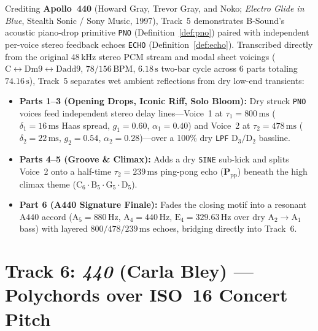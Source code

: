 Crediting \textbf{Apollo~440} (Howard Gray, Trevor Gray, and Noko; \emph{Electro Glide in Blue}, Stealth Sonic / Sony Music, 1997), Track~5 demonstrates B-Sound's acoustic piano-drop primitive \texttt{PNO} (Definition~\ref{def:pno}) paired with independent per-voice stereo feedback echoes \texttt{ECHO} (Definition~\ref{def:echo}). Transcribed directly from the original 48\,kHz stereo PCM stream and modal sheet voicings ($\mathrm{C} \leftrightarrow \mathrm{Dm9} \leftrightarrow \mathrm{Dadd9}$, $78/156\,\text{BPM}$, $6.18\,\text{s}$ two-bar cycle across $6$ parts totaling $74.16\,\text{s}$), Track~5 separates wet ambient reflections from dry low-end transients:
\begin{itemize}[leftmargin=1.5em]
  \item \textbf{Parts 1--3 (Opening Drops, Iconic Riff, Solo Bloom):} Dry struck \texttt{PNO} voices feed independent stereo delay lines—Voice~1 at $\tau_1 = 800\,\text{ms}$ ($\delta_1 = 16\,\text{ms}$ Haas spread, $g_1 = 0.60$, $\alpha_1 = 0.40$) and Voice~2 at $\tau_2 = 478\,\text{ms}$ ($\delta_2 = 22\,\text{ms}$, $g_2 = 0.54$, $\alpha_2 = 0.28$)—over a 100\% dry \texttt{LPF} $\mathrm{D}_3/\mathrm{D}_2$ bassline.
  \item \textbf{Parts 4--5 (Groove \& Climax):} Adds a dry \texttt{SINE} sub-kick and splits Voice~2 onto a half-time $\tau_2 = 239\,\text{ms}$ ping-pong echo ($\mathbf{P}_{\mathrm{pp}}$) beneath the high climax theme ($\mathrm{C}_6 \cdot \mathrm{B}_5 \cdot \mathrm{G}_5 \cdot \mathrm{D}_5$).
  \item \textbf{Part 6 (A440 Signature Finale):} Fades the closing motif into a resonant $\mathrm{A}440$ accord ($\mathrm{A}_5 = 880\,\text{Hz}$, $\mathrm{A}_4 = 440\,\text{Hz}$, $\mathrm{E}_4 = 329.63\,\text{Hz}$ over dry $\mathrm{A}_2 \to \mathrm{A}_1$ bass) with layered $800 / 478 / 239\,\text{ms}$ echoes, bridging directly into Track~6.
\end{itemize}

\section{Track 6: \emph{440} (Carla Bley) — Polychords over ISO~16 Concert Pitch}

